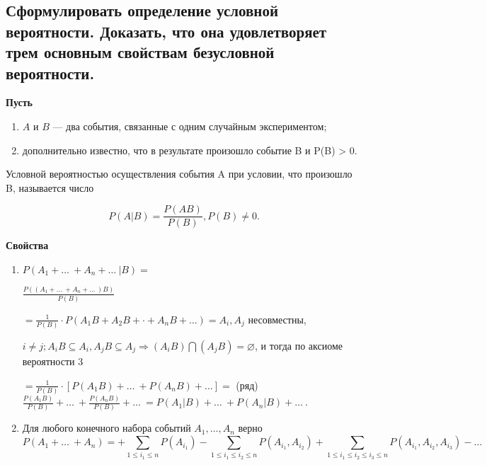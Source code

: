 \subsection{Сформулировать определение условной вероятности. Доказать, что она удовлетворяет трем основным свойствам безусловной вероятности.}

\textbf{Пусть} 

\begin{enumerate}
	\item $A$ и $B$ --- два события, связанные с одним случайным экспериментом;
	\item дополнительно известно, что в результате произошло событие B и P(B) > 0.
\end{enumerate}

Условной вероятностью осуществления события A при условии, что произошло B, называется число

\begin{equation}
	P(A|B) = \frac{P(AB)}{P(B)}, P(B) \neq 0.
\end{equation}

\textbf{Свойства}

\begin{enumerate}
	\item $P(A_1 + \dots\ + A_n + \dots\ | B) =$ 
	
	$\frac{P((A_1 + \dots\ + A_n + \dots\ )B)}{P(B)} $
	
	$= \frac{1}{P(B)} \cdot P(A_1 B + A_2 B + \cdot + A_n B + \dots) = A_i, A_j$ несовместны, 
	
	$i \neq j; A_i B \subseteq A_i, A_j B \subseteq A_j \Rightarrow (A_i B) \bigcap (A_j B) = \varnothing$, и тогда по аксиоме вероятности 3 
	
	$= \frac{1}{P(B)} \cdot [P(A_1 B) + \dots\ + P(A_n B) + \dots] = $ (ряд) $\frac{P(A_1 B)}{P(B)} + \dots\ + \frac{P(A_n B)}{P(B)} + \dots\ = P(A_1 | B) + \dots\ + P(A_n | B) + \dots\ $.
	
	\item Для любого конечного набора событий $A_1, \dots, A_n$ верно
	\begin{equation}
		P(A_1 + \dots\ + A_n) = + \sum\limits_{1 \leqslant i_1 \leqslant n}P(A_{i_1}) - \sum\limits_{1 \leqslant i_1 \leqslant i_2 \leqslant n}P(A_{i_1}, A_{i_2}) + \sum\limits_{1 \leqslant i_1 \leqslant i_2 \leqslant i_3 \leqslant n}P(A_{i_1}, A_{i_2}, A_{i_3}) - \dots
	\end{equation}

\end{enumerate}

